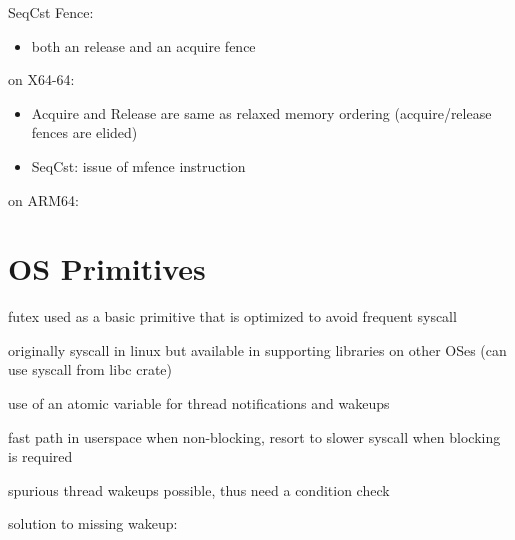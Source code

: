 \documentclass[8pt]{extarticle}
\begin{document}
\begin{multicols*}{2}
    SeqCst Fence:
    \begin{itemize}
      \item both an release and an acquire fence
    \end{itemize}  

    on X64-64:
    \begin{itemize}
    \item Acquire and Release are same as relaxed memory ordering (acquire/release fences are elided)
    \item SeqCst: issue of mfence instruction
    \end{itemize}
  
    on ARM64:

    \vfill\null
    \columnbreak
        
    \section{OS Primitives}

    futex used as a basic primitive that is optimized to avoid frequent syscall

    originally syscall in linux but available in supporting libraries on other OSes (can use syscall from libc crate)

    use of an atomic variable for thread notifications and wakeups

    fast path in userspace when non-blocking, resort to slower syscall when blocking is required

    spurious thread wakeups possible, thus need a condition check

    solution to missing wakeup:


\end{multicols*}
\end{document}
